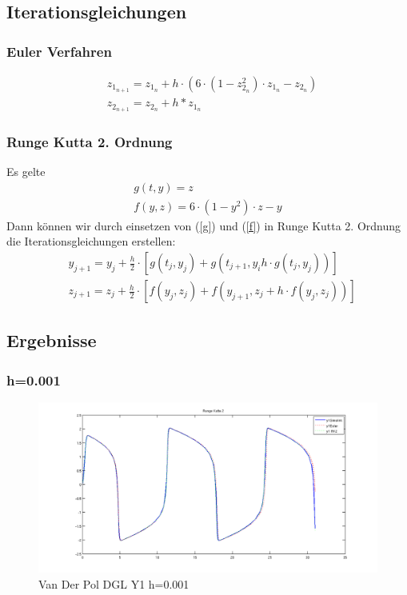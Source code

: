 \documentclass[10pt]{scrartcl}
\begin{document}
	\subsection{Iterationsgleichungen}	
	\subsubsection{Euler Verfahren}
	\begin{align}
		&z_{1_{n+1}} = z_{1_{n}} + h \cdot (6 \cdot (1-z_{2_{n}}^2) \cdot z_{1_{n}} - z_{2_{n}})\\
		&z_{2_{n+1}} = z_{2_n} + h * z_{1_n}
	\end{align}
	
	
	\subsubsection{Runge Kutta 2. Ordnung}
	Es gelte	
	\begin{align}
		g(t,y) = z \label{g}\\		
		f(y,z) = 6 \cdot (1-y^2) \cdot z - y \label{f}
	\end{align}
	Dann können wir durch einsetzen von (\ref{g}) und (\ref{f}) in Runge Kutta 2. Ordnung die Iterationsgleichungen erstellen:
	\begin{align}
		&y_{j+1}=y_j + \frac{h}{2} \cdot [g(t_j, y_j) + g(t_{j+1}, y_i h \cdot g(t_j, y_j))]\\
		&z_{j+1}=z_j + \frac{h}{2} \cdot [f(y_j, z_j) + f(y_{j+1}, z_j + h \cdot f(y_j, z_j))]
	\end{align} 
	
	
\subsection{Ergebnisse}
	\subsubsection{h=0.001}
		\begin{figure}[H]
			\centering	
			\includegraphics[width=\textwidth]{vanDerPolY10001.png}
            \caption{Van Der Pol DGL Y1 h=0.001}
            \label{pic:y2vdp0001}
		\end{figure} 
		
\end{document}
